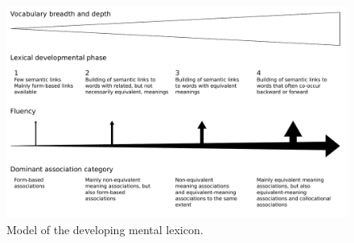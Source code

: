 \documentclass[output=paper,colorlinks,citecolor=brown,nonflat]{langsci/langscibook}
\begin{document}
\begin{figure}
    \includegraphics[width=\textwidth]{figures/Gudmundson-fig5mod.pdf}
    \caption{Model of the developing mental lexicon.}
    \label{fig:gudmundson:5}
\end{figure}
\end{document}
